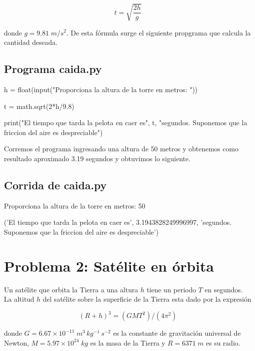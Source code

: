 \documentclass[12pt,spanish]{article}
\begin{document}
 \[t=\sqrt{\frac{2h}{g}} \]

donde $g=9.81 \; m/s^2$. De esta fórmula surge el siguiente  propgrama que calcula la cantidad deseada.


\subsection*{Programa caida.py}

\begin{center}
 \begin{boxedverbatim}
  h = float(input("Proporciona la altura de la torre 
  en metros: "))

  t = math.sqrt(2*h/9.8)

  print("El tiempo que tarda la pelota en caer es", t, 
  "segundos. Suponemos que  la friccion del aire es 
  despreciable")
 \end{boxedverbatim}
\end{center}

Corremos el programa ingresando una altura de 50 metros y obtenemos como resultado aproximado 3.19 segundos y obtuvimos lo siguiente.

\subsection*{Corrida de caida.py}

\begin{center}
 \begin{boxedverbatim}

  Proporciona la altura de la torre en metros: 50

  ('El tiempo que tarda la pelota en caer es', 
  3.1943828249996997, 'segundos. Suponemos que la 
  friccion del aire es despreciable')
 \end{boxedverbatim}
\end{center}



\section*{Problema 2: Satélite en órbita}

Un satélite que orbita la Tierra a una altura $h$ tiene un periodo $T$ en segundos. La altitud $h$ del satélite sobre la superficie de la Tierra esta dado por la expresión

 \[(R + h)^3 = (GMT^2)/(4 \pi^2) \]

donde $G = 6.67 \times 10^{-11} \; m^3 \, kg^{-1} \, s^{-2}$ es la constante de gravitación universal de Newton, $M = 5.97 \times 10^{24} \; kg$ es la masa de la Tierra y $R = 6371 \; m$ es su radio.
\end{document}
